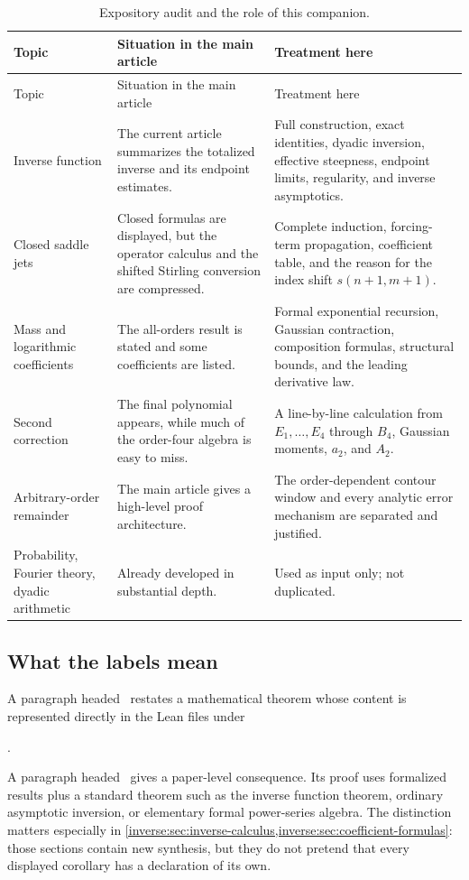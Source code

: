 \documentclass[11pt,oneside]{article}
\theoremstyle{definition}
\theoremstyle{remark}
\begin{document}
\begin{longtable}{>{\raggedright\arraybackslash}p{}
                  >{\raggedright\arraybackslash}p{}
                  >{\raggedright\arraybackslash}p{}}
\caption{Expository audit and the role of this companion.}
\label{inverse:tab:audit}\\
\toprule
Topic & Situation in the main article & Treatment here\\
\midrule
\endfirsthead
\toprule
Topic & Situation in the main article & Treatment here\\
\midrule
\endhead
Inverse function & The current article summarizes the totalized inverse and its endpoint
estimates. & Full construction, exact identities, dyadic inversion,
effective steepness, endpoint limits, regularity, and inverse
asymptotics.\\
Closed saddle jets & Closed formulas are displayed, but the operator
calculus and the shifted Stirling conversion are compressed. & Complete
induction, forcing-term propagation, coefficient table, and the reason for
the index shift $s(n+1,m+1)$.\\
Mass and logarithmic coefficients & The all-orders result is stated and
some coefficients are listed. & Formal exponential recursion, Gaussian
contraction, composition formulas, structural bounds, and the leading
derivative law.\\
Second correction & The final polynomial appears, while much of the
order-four algebra is easy to miss. & A line-by-line calculation from
$E_1,\dots,E_4$ through $B_4$, Gaussian moments, $a_2$, and $A_2$.\\
Arbitrary-order remainder & The main article gives a high-level proof
architecture. & The order-dependent contour window and every analytic
error mechanism are separated and justified.\\
Probability, Fourier theory, dyadic arithmetic & Already developed in
substantial depth. & Used as input only; not duplicated.\\
\bottomrule
\end{longtable}

\subsection{What the labels mean}

A paragraph headed \Formalized\ restates a mathematical theorem whose
content is represented directly in the Lean files under
\begin{center}
.
\end{center}
A paragraph headed \Derived\ gives a paper-level consequence.  Its proof
uses formalized results plus a standard theorem such as the inverse
function theorem, ordinary asymptotic inversion, or elementary formal
power-series algebra.  The distinction matters especially in
\cref{inverse:sec:inverse-calculus,inverse:sec:coefficient-formulas}: those sections contain
new synthesis, but they do not pretend that every displayed corollary has
a declaration of its own.
\end{document}
